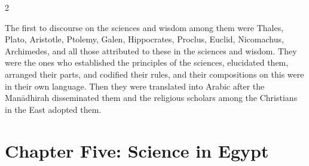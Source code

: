\documentclass[11pt,a4paper]{article}
\begin{document}
\begin{paracol}{2}
\begin{rightcolumn}
\vspace{0.3cm}
The first to discourse on the sciences and wisdom among them were Thales, Plato, Aristotle, Ptolemy, Galen, Hippocrates, Proclus, Euclid, Nicomachus, Archimedes, and all those attributed to these in the sciences and wisdom. They were the ones who established the principles of the sciences, elucidated them, arranged their parts, and codified their rules, and their compositions on this were in their own language. Then they were translated into Arabic after the Man\={a}dhirah disseminated them and the religious scholars among the Christians in the East adopted them.
\end{rightcolumn}

\end{paracol}

\clearpage

\section*{Chapter Five: Science in Egypt}
\end{document}
